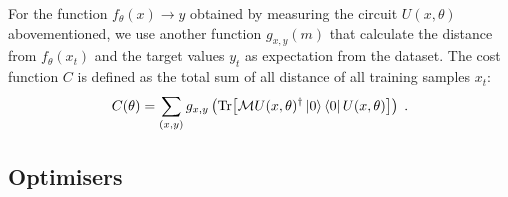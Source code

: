 For the function ${f_\theta(x) \rightarrow y}$ obtained by measuring the circuit $U(x, \theta)$ abovementioned, we use another function $g_{x,y}(m)$ that calculate the distance from $f_\theta(x_t)$ and the target values $y_t$ as expectation from the dataset.
The cost function $C$ is defined as the total sum of all distance of all training samples $x_t$:
\begin{equation}
    C(\theta) = \sum_{(x,y)} g_{x,y} \left(\Tr[ \mathcal{M} U(x, \theta)^\dagger \left\vert{0}\right\rangle \left\langle{0}\right\vert U(x, \theta) ]\right) \;.
    \label{Eqn: Cost function}
\end{equation}



\subsection{Optimisers} \label{Sec: Optimiser}
